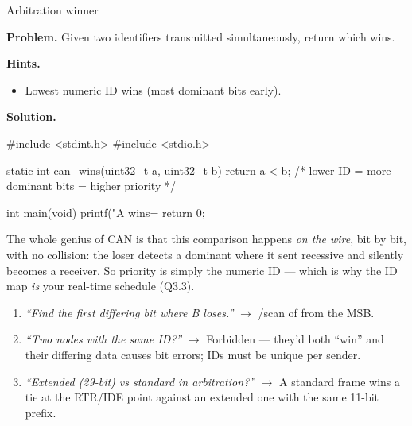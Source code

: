 \begin{gymproblem}{Arbitration winner}

\textbf{Problem.} Given two identifiers transmitted simultaneously, return
which wins.

\textbf{Hints.}
\begin{itemize}
\item Lowest numeric ID wins (most dominant bits early).
\end{itemize}

\attempt

\textbf{Solution.}
\begin{cgym}
#include <stdint.h>
#include <stdio.h>

static int can_wins(uint32_t a, uint32_t b) {
    return a < b;       /* lower ID = more dominant bits = higher priority */
}

int main(void) {
    printf("A wins=%
    return 0;
}
\end{cgym}

The whole genius of CAN is that this comparison happens \emph{on the wire},
bit by bit, with no collision: the loser detects a dominant where it sent
recessive and silently becomes a receiver. So priority is simply the numeric ID
--- which is why the ID map \emph{is} your real-time schedule (Q3.3).

\followups
\begin{enumerate}
\item \emph{``Find the first differing bit where B loses.''} $\rightarrow$
  /scan of  from the MSB.
\item \emph{``Two nodes with the same ID?''} $\rightarrow$ Forbidden --- they'd
  both ``win'' and their differing data causes bit errors; IDs must be unique
  per sender.
\item \emph{``Extended (29-bit) vs standard in arbitration?''} $\rightarrow$ A
  standard frame wins a tie at the RTR/IDE point against an extended one with
  the same 11-bit prefix.
\end{enumerate}
\end{gymproblem}

